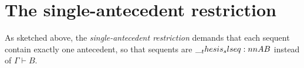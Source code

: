 








\section{The single-antecedent restriction}\label{sec:singleton-logic:restriction}

As sketched above, the \emph{single-antecedent restriction} demands that each sequent contain exactly one antecedent, so that sequents are $\slseq{A |- B}$ instead of $\Gamma \vdash B$.

